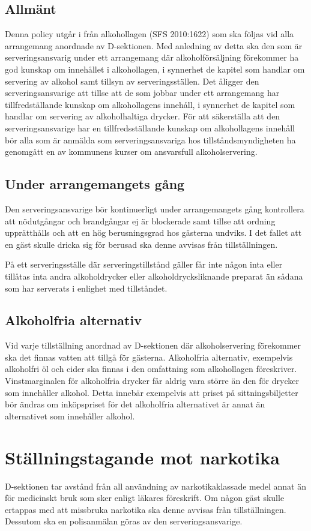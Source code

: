 \documentclass[]{dsekprotokoll}
\begin{document}
\subsection{Allmänt}
Denna policy utgår i från alkohollagen (SFS 2010:1622) som ska följas
vid alla arrangemang anordnade av D-sektionen. Med anledning av detta
ska den som är serveringsansvarig under ett arrangemang där
alkoholförsäljning förekommer ha god kunskap om innehållet i
alkohollagen, i synnerhet de kapitel som handlar om servering av
alkohol samt tillsyn av serveringsställen. Det åligger den
serveringsansvarige att tillse att de som jobbar under ett
arrangemang har tillfredställande kunskap om alkohollagens innehåll,
i synnerhet de kapitel som handlar om servering av alkoholhaltiga
drycker. För att säkerställa att den serveringsansvarige har en
tillfredsställande kunskap om alkohollagens innehåll bör alla som är
anmälda som serveringsansvariga hos tillståndsmyndigheten ha
genomgått en av kommunens kurser om ansvarsfull alkoholservering.

\subsection{Under arrangemangets gång}
Den serveringsansvarige bör kontinuerligt under arrangemangets gång
kontrollera att nödutgångar och brandgångar ej är blockerade samt
tillse att ordning upprätthålls och att en hög berusningsgrad hos
gästerna undviks. I det fallet att en gäst skulle dricka sig för berusad ska
denne avvisas från tillställningen.

På ett serveringsställe där serveringstillstånd gäller får inte någon
inta eller tillåtas inta andra alkoholdrycker eller
alkoholdrycksliknande preparat än sådana som har serverats i enlighet
med tillståndet.

\subsection{Alkoholfria alternativ}
Vid varje tillställning anordnad av D-sektionen där alkoholservering
förekommer ska det finnas vatten att tillgå för gästerna. Alkoholfria
alternativ, exempelvis alkoholfri öl och cider ska finnas i den
omfattning som alkohollagen föreskriver. Vinstmarginalen för
alkoholfria drycker får aldrig vara större än den för drycker som
innehåller alkohol. Detta innebär exempelvis att priset på
sittningsbiljetter bör ändras om inköpspriset för det alkoholfria
alternativet är annat än alternativet som innehåller alkohol.

\section{Ställningstagande mot narkotika}
D-sektionen tar avstånd från all användning av narkotikaklassade
medel annat än för medicinskt bruk som sker enligt läkares
föreskrift. Om någon gäst skulle ertappas med att missbruka narkotika
ska denne avvisas från tillställningen. Dessutom ska en polisanmälan
göras av den serveringsansvarige.
\end{document}
